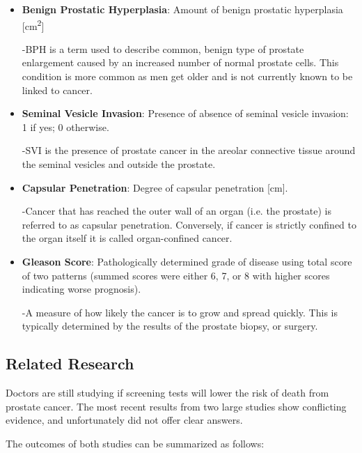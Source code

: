 \begin{itemize}
	\item \textbf{Benign Prostatic Hyperplasia}: Amount of benign prostatic hyperplasia [cm\textsuperscript{2}] \par
		-BPH is a term used to describe common, benign type of prostate enlargement caused by an increased number of normal prostate cells. This condition is more common as men get older and is not currently known to be linked to cancer.
		
	\item \textbf{Seminal Vesicle Invasion}: Presence of absence of seminal vesicle invasion: 1 if yes; 0 otherwise. \par
		-SVI is the presence of prostate cancer in the areolar connective tissue around the seminal vesicles and outside the prostate.
		
	\item \textbf{Capsular Penetration}: Degree of capsular penetration [cm]. \par
		-Cancer that has reached the outer wall of an organ (i.e. the prostate) is referred to as capsular penetration. Conversely, if cancer is strictly confined to the organ itself it is called organ-confined cancer.
		
	\item \textbf{Gleason Score}: Pathologically determined grade of disease using total score of two patterns (summed scores were either 6, 7, or 8 with higher scores indicating worse prognosis). \par
		-A measure of how likely the cancer is to grow and spread quickly. This is typically determined by the results of the prostate biopsy, or surgery.
		
\end{itemize}

\subsection{Related Research}

Doctors are still studying if screening tests will lower the risk of death from prostate cancer. The most recent results from two large studies show conflicting evidence, and unfortunately did not offer clear answers. \par

The outcomes of both studies can be summarized as follows:

